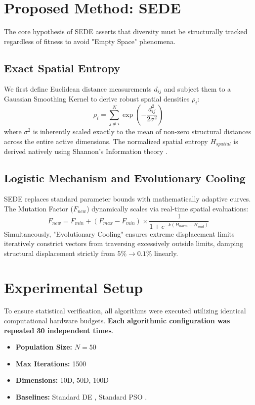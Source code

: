 \documentclass[conference]{IEEEtran}
\begin{document}
\section{Proposed Method: SEDE}
The core hypothesis of SEDE asserts that diversity must be structurally tracked regardless of fitness to avoid "Empty Space" phenomena. 

\subsection{Exact Spatial Entropy}
We first define Euclidean distance measurements $d_{ij}$ and subject them to a Gaussian Smoothing Kernel to derive robust spatial densities $\rho_i$:
\begin{equation}
\rho_i = \sum_{j \neq i}^{N} \exp\left( -\frac{d_{ij}^2}{2\sigma^2} \right)
\end{equation}
where $\sigma^2$ is inherently scaled exactly to the mean of non-zero structural distances across the entire active dimensions. The normalized spatial entropy $H_{spatial}$ is derived natively using Shannon's Information theory \cite{b6}.

\subsection{Logistic Mechanism and Evolutionary Cooling}
SEDE replaces standard parameter bounds with mathematically adaptive curves. The Mutation Factor ($F_{new}$) dynamically scales via real-time spatial evaluations:
\begin{equation}
F_{new} = F_{min} + (F_{max} - F_{min}) \times \frac{1}{1 + e^{-k(H_{norm} - H_{mid})}}
\end{equation}
Simultaneously, "Evolutionary Cooling" ensures extreme displacement limits iteratively constrict vectors from traversing excessively outside limits, damping structural displacement strictly from $5\% \rightarrow 0.1\%$ linearly.

\section{Experimental Setup}
To ensure statistical verification, all algorithms were executed utilizing identical computational hardware budgets. \textbf{Each algorithmic configuration was repeated 30 independent times}. 
\begin{itemize}
    \item \textbf{Population Size:} $N=50$
    \item \textbf{Max Iterations:} 1500
    \item \textbf{Dimensions:} 10D, 50D, 100D
    \item \textbf{Baselines:} Standard DE \cite{b7}, Standard PSO \cite{b2}.
\end{itemize}
\end{document}
